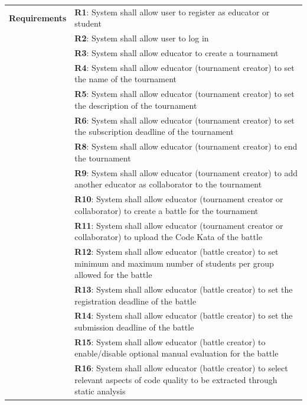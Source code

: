 \begin{center}
    \begin{tabular}{ |m{3cm}|m{10cm}| }
        \hline
        \textbf{Requirements} 
        & \textbf{R1}: System shall allow user to register as educator or student \\
        & \textbf{R2}: System shall allow user to log in \\
        & \textbf{R3}: System shall allow educator to create a tournament \\
        & \textbf{R4}: System shall allow educator (tournament creator) to set the name of the tournament \\
        & \textbf{R5}: System shall allow educator (tournament creator) to set the description of the tournament \\
        & \textbf{R6}: System shall allow educator (tournament creator) to set the subscription deadline of the tournament \\
        & \textbf{R8}: System shall allow educator (tournament creator) to end the tournament \\
        & \textbf{R9}: System shall allow educator (tournament creator) to add another educator as collaborator to the tournament \\
        & \textbf{R10}: System shall allow educator (tournament creator or collaborator) to create a battle for the tournament \\
        & \textbf{R11}: System shall allow educator (tournament creator or collaborator) to upload the Code Kata of the battle \\
        & \textbf{R12}: System shall allow educator (battle creator) to set minimum and maximum number of students per group allowed for the battle \\
        & \textbf{R13}: System shall allow educator (battle creator) to set the registration deadline of the battle \\
        & \textbf{R14}: System shall allow educator (battle creator) to set the submission deadline of the battle \\
        & \textbf{R15}: System shall allow educator (battle creator) to enable/disable optional manual evaluation for the battle \\
        & \textbf{R16}: System shall allow educator (battle creator) to select relevant aspects of code quality to be extracted through static analysis \\
        \hline
    \end{tabular}
    \begin{tabular}{ |m{3cm}|m{10cm}| }

\end{tabular}
\end{center}
